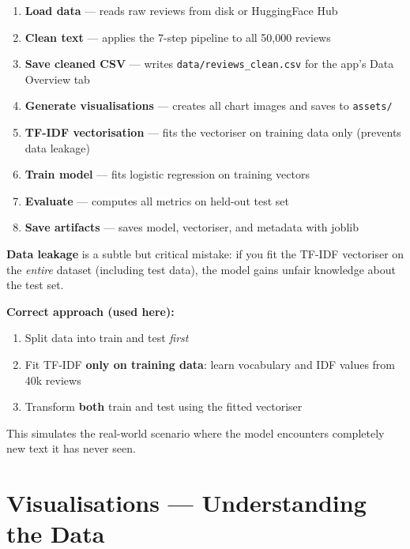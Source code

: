 \documentclass[12pt, a4paper]{article}
\begin{document}
\begin{enumerate}
  \item \textbf{Load data} — reads raw reviews from disk or HuggingFace Hub
  \item \textbf{Clean text} — applies the 7-step pipeline to all 50{,}000 reviews
  \item \textbf{Save cleaned CSV} — writes \texttt{data/reviews\_clean.csv} for the app's Data Overview tab
  \item \textbf{Generate visualisations} — creates all chart images and saves to \texttt{assets/}
  \item \textbf{TF-IDF vectorisation} — fits the vectoriser on training data only (prevents data leakage)
  \item \textbf{Train model} — fits logistic regression on training vectors
  \item \textbf{Evaluate} — computes all metrics on held-out test set
  \item \textbf{Save artifacts} — saves model, vectoriser, and metadata with joblib
\end{enumerate}

\begin{conceptbox}
\textbf{Data leakage} is a subtle but critical mistake: if you fit the TF-IDF vectoriser on the \emph{entire} dataset (including test data), the model gains unfair knowledge about the test set.

\medskip
\textbf{Correct approach (used here):}
\begin{enumerate}
  \item Split data into train and test \emph{first}
  \item Fit TF-IDF \textbf{only on training data}: learn vocabulary and IDF values from 40k reviews
  \item Transform \textbf{both} train and test using the fitted vectoriser
\end{enumerate}

This simulates the real-world scenario where the model encounters completely new text it has never seen.
\end{conceptbox}

\newpage

\section{Visualisations — Understanding the Data}
\end{document}
